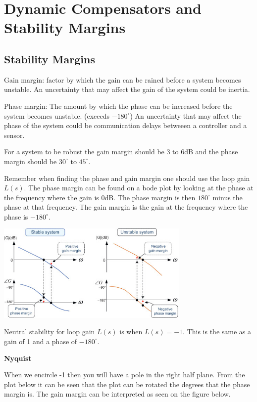 \section{Dynamic Compensators and Stability Margins}

\subsection{Stability Margins}

Gain margin: factor by which the gain can be rained before a system becomes unstable.
An uncertainty that may affect the gain of the system could be inertia.


Phase margin: The amount by which the phase can be increased before the system becomes unstable. (exceeds $-180 ^\circ$)
An uncertainty that may affect the phase of the system could be communication delays betweeen a controller and a sensor.

For a system to be robust the gain margin should be 3 to 6dB and the phase margin
should be $30^\circ$ to $45^\circ$.

Remember when finding the phase and gain margin one should use the loop gain $L(s)$.
The phase margin can be found on a bode plot by looking at the phase at the frequency
where the gain is 0dB. The phase margin is then $180^\circ$ minus the phase at that frequency.
The gain margin is the gain at the frequency where the phase is $-180^\circ$.


\begin{center}
	\includegraphics[width=0.7\textwidth]{Images/margin.jpg}
\end{center}


Neutral stability for loop gain $L(s)$ is when $L(s) = -1$. This is the same as a gain of 1 and a phase of $-180^\circ$.


\textbf{Nyquist}

When we encircle -1 then you will have a pole in the right half plane. From the plot below
it can be seen that the plot can be rotated the degrees that the phase margin is.
The gain margin can be interpreted as seen on the figure below.

